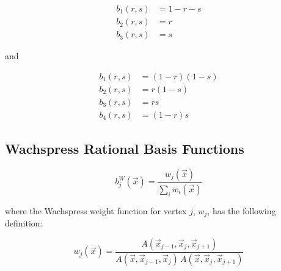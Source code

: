 \begin{equation}
\label{eq::2D_lin_basis_functions}
\begin{aligned}
	b_1(r,s) & = 1-r-s \\
	b_2(r,s) & = r \\
	b_3(r,s) & = s 
\end{aligned}
\end{equation}

\noindent 

and

\begin{equation}
\label{eq::BiL_basis_functions}
\begin{aligned}
	b_1(r,s) & = (1-r)(1-s) \\
	b_2(r,s) & = r(1-s) \\
	b_3(r,s) & = rs \\
	b_4(r,s) & = (1-r)s
\end{aligned}
\end{equation}


\subsection{Wachspress Rational Basis Functions}
\label{sec::BF_2DLinear_Wachspress}

\begin{equation}
\label{eq::BF_wach_BF}
b_{j}^{W} (\vec{x}) = \frac{w_j (\vec{x}) }{\sum_i w_i (\vec{x})}
\end{equation}

\noindent where the Wachspress weight function for vertex $j$, $w_j$, has the following definition:

\begin{equation}
\label{eq::BF_wach_weights}
w_j (\vec{x})  = \frac{A(\vec{x}_{j-1}, \vec{x}_{j}, \vec{x}_{j+1})}{A(\vec{x}, \vec{x}_{j-1}, \vec{x}_{j}) \, A(\vec{x}, \vec{x}_{j}, \vec{x}_{j+1})}
\end{equation}



